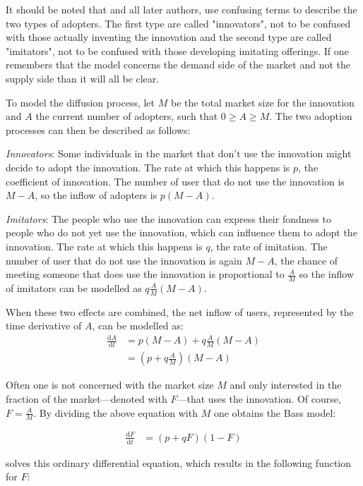 \documentclass[smallextended,final]{svjour3}
\newcommand{\nd}[2]{\frac{\mathrm{d} #1}{\mathrm{d} #2}}
\begin{document}
It should be noted that \cite{bass69} and all later authors, use confusing terms to describe the two types of adopters. The first type are called "innovators", not to be confused with those actually inventing the innovation and the second type are called "imitators", not to be confused with those developing imitating offerings. If one remembers that the model concerns the demand side of the market and not the supply side than it will all be clear.

To model the diffusion process, let $M$ be the total market size for the innovation and $A$ the current number of adopters, such that $0 \ge A \ge M$. The two adoption processes can then be described as follows: \citep[see also][]{bass10,mahajan90}

\emph{Innovators}: Some individuals in the market that don't use the innovation might decide to adopt the innovation. The rate at which this happens is $p$, the coefficient of innovation. The number of user that do not use the innovation is $M-A$, so the inflow of adopters is $p(M-A)$.

\emph{Imitators}: The people who use the innovation can express their fondness to people who do not yet use the innovation, which can influence them to adopt the innovation. The rate at which this happens is $q$, the rate of imitation. The number of user that do not use the innovation is again $M-A$, the chance of meeting someone that does use the innovation is proportional to $\frac{A}{M}$ so the inflow of imitators can be modelled as $q\frac{A}{M}(M-A)$.

When these two effects are combined, the net inflow of users, represented by the time derivative of $A$, can be modelled as:
\begin{align*}
\nd{A}{t} &= p(M - A) + q\frac{A}{M}(M - A) \\
&= \left(p + q\frac{A}{M} \right)(M - A)
\end{align*}

Often one is not concerned with the market size $M$ and only interested in the fraction of the market---denoted with $F$---that uses the innovation. Of course, $F=\frac{A}{M}$. By dividing the above equation with $M$ one obtains the Bass model:

\begin{align}\label{eq:bass-ode}
\nd{F}{t} &= \left(p + q F\right)(1 - F)
\end{align}

\cite{bass69} solves this ordinary differential equation, which results in the following function for $F$:
\end{document}

